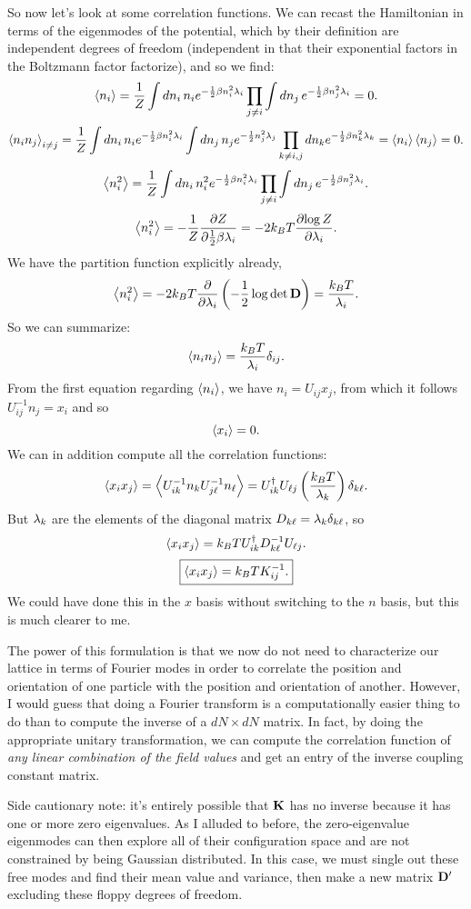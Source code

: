 \documentclass[12pt]{article}
\begin{document}
So now let's look at some correlation functions. We can recast the Hamiltonian in terms of the eigenmodes of the potential, which by their definition are independent degrees of freedom (independent in that their exponential factors in the Boltzmann factor factorize), and so we find:
\[ \left \langle n_i \right \rangle = \frac{1}{Z} \int dn_i \, n_i e^{-\frac{1}{2} \beta n_i^2 \lambda_i} \prod_{j\neq i} \int dn_j \, e^{-\frac{1}{2}\beta n_j^2 \lambda_i} = 0.\]
\[ \left \langle n_i n_j \right \rangle_{i\neq j} = \frac{1}{Z} \int dn_i \, n_i e^{-\frac{1}{2} \beta n_i^2 \lambda_i} \int dn_j \, n_j e^{-\frac{1}{2} n_j^2 \lambda _ j} \prod_{k \neq i,j} dn_k e^{-\frac{1}{2} \beta n_k^2 \lambda_k} = \left \langle n_i \right \rangle\left \langle n_j \right \rangle = 0.\]
\[ \left \langle n_i^2 \right \rangle = \frac{1}{Z} \int dn_i \, n_i^2 e^{-\frac{1}{2} \beta n_i^2 \lambda_i} \prod_{j\neq i} \int dn_j \, e^{-\frac{1}{2}\beta n_j^2 \lambda_i}.\]
\[ \left \langle n_i^2 \right \rangle = -\frac{1}{Z} \frac{\partial {Z}}{\partial {\frac{1}{2} \beta\lambda_i}} = -2k_BT \frac{\partial {\log Z}}{\partial {\lambda_i}}.\]
We have the partition function explicitly already,
\[ \left \langle n_i^2 \right \rangle = -2k_BT \frac{\partial {}}{\partial {\lambda_i}} \left( -\frac{1}{2} \log \det \mathbf{D}\right) = \frac{k_BT}{\lambda_i}.\]
So we can summarize:
\[ \left \langle n_in_j \right \rangle = \frac{k_BT}{\lambda_i}\delta_{ij}.\]
From the first equation regarding $\left \langle n_i \right \rangle$, we have $n_i = U_{ij} x_j$, from which it follows $U^{-1}_{ij} n_j = x_i$ and so
\[ \left \langle x_i \right \rangle = 0.\]
We can in addition compute all the correlation functions:
\[ \left \langle x_i x_j \right \rangle = \left \langle U^{-1}_{ik}n_k U^{-1}_{j\ell}n_\ell \right \rangle = U^\dagger_{ik} U_{\ell j} \left(\frac{k_BT}{\lambda_k}\right)\delta_{k\ell}.\]
But $\lambda_k$ are the elements of the diagonal matrix $D_{k\ell} = \lambda_k \delta_{k\ell}$, so
\[ \left \langle x_i x_j \right \rangle = k_BT U^\dagger_{ik} D^{-1}_{k\ell} U_{\ell j}.\]
\[ \boxed{\left \langle x_i x_j \right \rangle = k_BT K^{-1}_{ij}.}\]
We could have done this in the $x$ basis without switching to the $n$ basis, but this is much clearer to me.

The power of this formulation is that we now do not need to characterize our lattice in terms of Fourier modes in order to correlate the position and orientation of one particle with the position and orientation of another. However, I would guess that doing a Fourier transform is a computationally easier thing to do than to compute the inverse of a $dN \times dN$ matrix. In fact, by doing the appropriate unitary transformation, we can compute the correlation function of \emph{any linear combination of the field values} and get an entry of the inverse coupling constant matrix.

Side cautionary note: it's entirely possible that $\mathbf{K}$ has no inverse because it has one or more zero eigenvalues. As I alluded to before, the zero-eigenvalue eigenmodes can then explore all of their configuration space and are not constrained by being Gaussian distributed. In this case, we must single out these free modes and find their mean value and variance, then make a new matrix $\mathbf{D}'$ excluding these floppy degrees of freedom.
\end{document}
